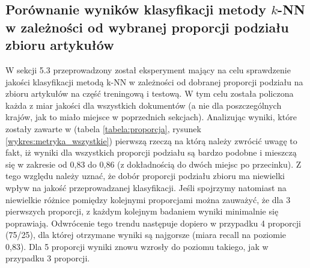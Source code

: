 \documentclass{classrep}
\begin{document}
\subsection{Porównanie wyników klasyfikacji metody $k$-NN w zależności od wybranej proporcji podziału zbioru artykułów}
W sekcji 5.3 przeprowadzony został eksperyment mający na celu sprawdzenie jakości klasyfikacji metodą k-NN w zależności od dobranej proporcji podziału na zbioru artykułów na część treningową i testową. W tym celu została policzona każda z miar jakości dla wszystkich dokumentów (a nie dla poszczególnych krajów, jak to miało miejsce w poprzednich sekcjach).  Analizując wyniki, które zostały zawarte w (tabela \ref{tabela:proporcja}, rysunek \ref{wykres:metryka_wszystkie}) pierwszą rzeczą na którą należy zwrócić uwagę to fakt, iż wyniki dla wszystkich proporcji podziału są bardzo podobne i mieszczą się w zakresie od 0,83 do 0,86 (z dokładnością do dwóch miejsc po przecinku). Z tego względu należy uznać, że dobór proporcji podziału zbioru ma niewielki wpływ na jakość przeprowadzanej klasyfikacji. 
Jeśli spojrzymy natomiast na niewielkie różnice pomiędzy kolejnymi proporcjami można zauważyć, że dla 3 pierwszych proporcji, z każdym kolejnym badaniem wyniki minimalnie się poprawiają. Odwrócenie tego trendu następuje dopiero w przypadku 4 proporcji (75/25), dla której otrzymane wyniki są najgorsze (miara recall na poziomie 0,83). Dla 5 proporcji wyniki znowu wzrosły do poziomu takiego, jak w przypadku 3 proporcji. 
\end{document}
